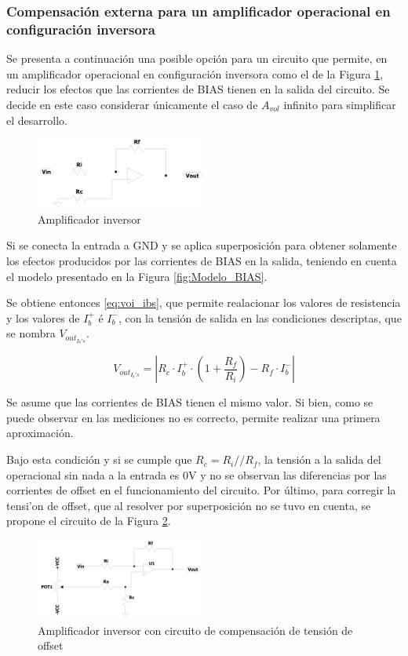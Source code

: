 \subsubsection{Compensaci\'on externa para un amplificador operacional en configuraci\'on inversora}
Se presenta a continuaci\'on una posible opci\'on para un circuito que permite, en un amplificador operacional en configuraci\'on inversora como el de la Figura \ref{fig:Inversor}, reducir los efectos que las corrientes de BIAS tienen en la salida del circuito. Se decide en este caso considerar \'unicamente el caso de $A_{vol}$ infinito para simplificar el desarrollo.
\begin{figure}[H]
    
    \centering
    \includegraphics[width=0.5\textwidth]{../EJ3/Recursos/Inversor}
    \caption{\label{fig:Inversor}Amplificador inversor}
\end{figure}
Si se conecta la entrada a GND y se aplica superposici\'on para obtener solamente los efectos producidos por las corrientes de BIAS en la salida, teniendo en cuenta el modelo presentado en la Figura \ref{fig:Modelo_BIAS}.

Se obtiene entonces \ref{eq:voi_ibs}, que permite realacionar los valores de resistencia y los valores de $I_b^+$ \'e $I_b^-$, con la tensi\'on de salida en las condiciones descriptas, que se nombra $V_{out_{I_b's}}$.

\begin{equation}
    V_{out_{I_b's}} = \left|R_c \cdot I_b^+ \cdot \left( 1+\frac{R_f}{R_i}\right) - R_f \cdot I_b^-\right|
    \label{eq:voi_ibs}
\end{equation}

Se asume que las corrientes de BIAS tienen el mismo valor. Si bien, como se puede observar en las mediciones no es correcto, permite realizar una primera aproximaci\'on.

Bajo esta condici\'on y si se cumple que $R_c = R_i//R_f$, la tensi\'on a la salida del operacional sin nada a la entrada es 0V y no se observan las diferencias por las corrientes de offset en el funcionamiento del circuito.
Por \'ultimo, para corregir la tensi'on de offset, que al resolver por superposici\'on no se tuvo en cuenta, se propone el circuito de la Figura \ref{fig:Off_comp}.
\begin{figure}[H]
    
    \centering
    \includegraphics[width=0.5\textwidth]{../EJ3/Recursos/Off_comp}
    \caption{\label{fig:Off_comp}Amplificador inversor con circuito de compensaci\'on de tensi\'on de offset }
\end{figure}

